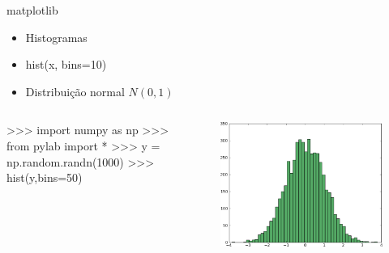 \documentclass[12pt,t,graphics]{beamer}
\begin{document}
\begin{frame}[t,fragile]{matplotlib}
	\begin{itemize}
		\item Histogramas
		\item hist(x, bins=10)
		\item Distribuição normal $N(0,1)$
	\end{itemize}
	
	\begin{columns}
		\begin{python}
>>> import numpy as np
>>> from pylab import *
>>> y = np.random.randn(1000)
>>> hist(y,bins=50)
		\end{python}
		
		\vspace{-1cm}
		\begin{figure}
			\centering
			\includegraphics[scale=0.32]{img/plot5.png}
		\end{figure}
	\end{columns}
	
\end{frame}
\end{document}
